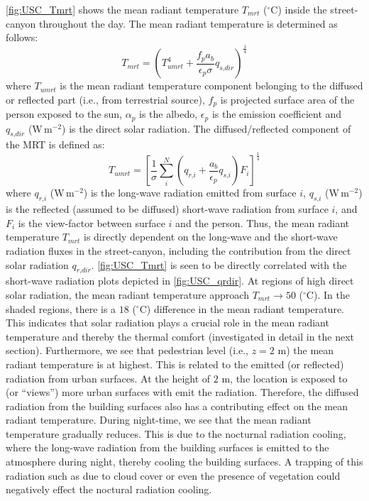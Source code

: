 \cref{fig:USC_Tmrt} shows the mean radiant temperature $T_{\textit{mrt}}$  ($^{\circ}$C) inside the street-canyon throughout the day. The mean radiant temperature is determined as follows: 
\begin{equation}
T_{\textit{mrt}} = \left( T_{\textit{umrt}}^4  + \frac{f_p a_b}{\epsilon_p \sigma} q_{\textit{s,dir}} \right)^{\frac{1}{4}}
\label{eq:Tmrt2}
\end{equation}
where $T_{\textit{umrt}}$ is the mean radiant temperature component belonging to the diffused or reflected part (i.e., from terrestrial source), $f_p$ is projected surface area of the person exposed to the sun, $\alpha_p$ is the albedo, $\epsilon_p$ is the emission coefficient and $q_{\textit{s,dir}}$ (W\,m$^{-2}$) is the direct solar radiation. The diffused/reflected component of the MRT is defined as:
\begin{equation}
T_{\textit{umrt}} = \left[ \frac{1}{\sigma} \sum_{i}^N \left(q_{\textit{r,i}} + \frac{a_b}{\epsilon_p} q_{\textit{s,i}} \right)F_i\right]^{\frac{1}{4}}
\label{eq:Tumrt2}
\end{equation}
where $q_{\textit{r,i}}$ (W\,m$^{-2}$)  is the long-wave radiation emitted from surface $i$, $q_{\textit{s,i}}$ (W\,m$^{-2}$) is the reflected (assumed to be diffused) short-wave radiation from surface $i$, and $F_i$ is the view-factor between surface $i$ and the person. Thus, the mean radiant temperature $T_{\textit{mrt}}$ is directly dependent on the long-wave and the short-wave radiation fluxes in the street-canyon, including the contribution from the direct solar radiation $q_{\textit{r,dir}}$. \cref{fig:USC_Tmrt} is seen to be directly correlated with the short-wave radiation plots depicted in \cref{fig:USC_qrdir}. At regions of high direct solar radiation, the mean radiant temperature approach $T_{\textit{mrt}}\rightarrow50$ ($^{\circ}$C). In the shaded regions, there is a $18$  ($^{\circ}$C) difference in the mean radiant temperature. This indicates that solar radiation plays a crucial role in the mean radiant temperature and thereby the thermal comfort (investigated in detail in the next section). Furthermore, we see that pedestrian level (i.e., $z=2$ m) the mean radiant temperature is at highest. This is related to the emitted (or reflected) radiation from urban surfaces. At the height of $2$ m, the location is exposed to (or ``views'') more urban surfaces with emit the radiation. Therefore, the diffused radiation from the building surfaces also has a contributing effect on the mean radiant temperature. During night-time, we see that the mean radiant temperature gradually reduces. This is due to the nocturnal radiation cooling, where the long-wave radiation from the building surfaces is emitted to the atmosphere during night, thereby cooling the building surfaces. A trapping of this radiation such as due to cloud cover or even the presence of vegetation could negatively effect the noctural radiation cooling. 

